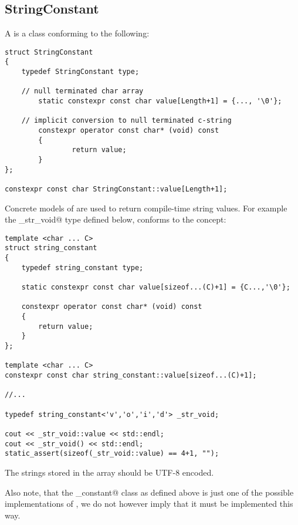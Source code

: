 \subsection{StringConstant}
\label{concept-StringConstant}

A  is a class conforming to the following:

\begin{lstlisting}
struct StringConstant
{
	typedef StringConstant type;

	// null terminated char array
        static constexpr const char value[Length+1] = {..., '\0'};

	// implicit conversion to null terminated c-string
        constexpr operator const char* (void) const
        {
                return value;
        }
};

constexpr const char StringConstant::value[Length+1];
\end{lstlisting}

Concrete models of  are used to return compile-time string values.
For example the \verb@_str_void@ type defined below, conforms to the 
concept:

\begin{lstlisting}
template <char ... C>
struct string_constant
{
	typedef string_constant type;

	static constexpr const char value[sizeof...(C)+1] = {C...,'\0'};

	constexpr operator const char* (void) const
	{
		return value;
	}
};

template <char ... C>
constexpr const char string_constant::value[sizeof...(C)+1];

//...

typedef string_constant<'v','o','i','d'> _str_void;

cout << _str_void::value << std::endl;
cout << _str_void() << std::endl;
static_assert(sizeof(_str_void::value) == 4+1, "");
\end{lstlisting}

The strings stored in the \verb@value@ array should be UTF-8 encoded.

Also note, that the \verb@string_constant@ class as defined above is just one of the
possible implementations of , we do not however imply
that it must be implemented this way.
